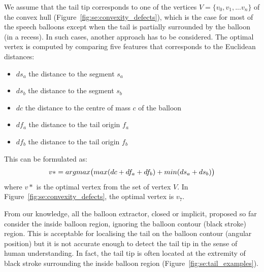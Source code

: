 We assume that the tail tip corresponds to one of the vertices $V=\{v_0,v_1,...v_n\}$ of the convex hull (Figure~\ref{fig:se:convexity_defects}), which is the case for most of the speech balloons except when the tail is partially surrounded by the balloon (in a recess).
In such cases, another approach has to be considered.
The optimal vertex is computed by comparing five features that corresponds to the Euclidean distances:

\begin{itemize}
   \item $ds_a$ the distance to the segment $s_a$
   \item $ds_b$ the distance to the segment $s_b$
   \item $dc$ the distance to the centre of mass $c$ of the balloon
   \item $df_a$ the distance to the tail origin $f_a$
   \item $df_b$ the distance to the tail origin $f_b$
 \end{itemize}

This can be formulated as:
\begin{equation}\label{eq:se:optimisation}
   v* = argmax\big( max(dc+df_a+df_b) + min(ds_a + ds_b) \big)\\
 \end{equation}
 where $v*$ is the optimal vertex from the set of vertex $V$.
In Figure~\ref{fig:se:convexity_defects}, the optimal vertex is $v_7$.


From our knowledge, all the balloon extractor, closed or implicit, proposed so far consider the inside balloon region, ignoring the balloon contour (black stroke) region.
This is acceptable for localising the tail on the balloon contour (angular position) but it is not accurate enough to detect the tail tip in the sense of human understanding.
In fact, the tail tip is often located at the extremity of black stroke surrounding the inside balloon region (Figure~\ref{fig:se:tail_examples}).


